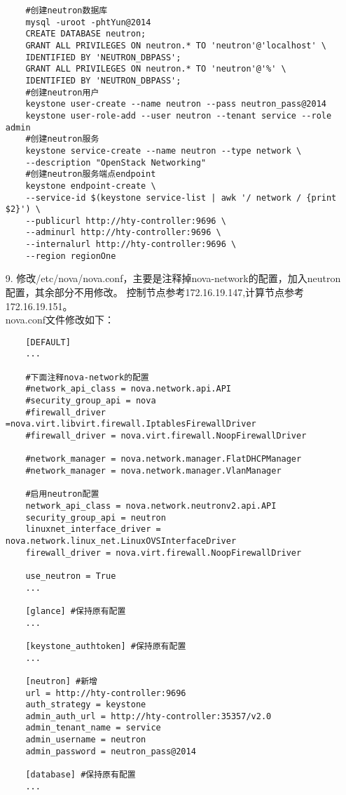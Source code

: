 \documentclass[a4paper,left=1.5cm,right=1.5cm,11pt]{article}
\begin{document}
\begin{itemize}
\begin{lstlisting}
	#创建neutron数据库
	mysql -uroot -phtYun@2014
	CREATE DATABASE neutron;
	GRANT ALL PRIVILEGES ON neutron.* TO 'neutron'@'localhost' \
	IDENTIFIED BY 'NEUTRON_DBPASS';
	GRANT ALL PRIVILEGES ON neutron.* TO 'neutron'@'%' \
	IDENTIFIED BY 'NEUTRON_DBPASS';
    #创建neutron用户
	keystone user-create --name neutron --pass neutron_pass@2014
	keystone user-role-add --user neutron --tenant service --role admin
	#创建neutron服务
	keystone service-create --name neutron --type network \
	--description "OpenStack Networking"
    #创建neutron服务端点endpoint
	keystone endpoint-create \
	--service-id $(keystone service-list | awk '/ network / {print $2}') \
	--publicurl http://hty-controller:9696 \
	--adminurl http://hty-controller:9696 \
	--internalurl http://hty-controller:9696 \
	--region regionOne
	\end{lstlisting}
    \item[9.]修改/etc/nova/nova.conf，主要是注释掉nova-network的配置，加入neutron配置，其余部分不用修改。
	控制节点参考172.16.19.147,计算节点参考172.16.19.151。\\
	nova.conf文件修改如下：
	\begin{lstlisting}
	[DEFAULT]
	...
	
	#下面注释nova-network的配置
	#network_api_class = nova.network.api.API
	#security_group_api = nova
	#firewall_driver =nova.virt.libvirt.firewall.IptablesFirewallDriver
	#firewall_driver = nova.virt.firewall.NoopFirewallDriver

	#network_manager = nova.network.manager.FlatDHCPManager
	#network_manager = nova.network.manager.VlanManager

	#启用neutron配置
	network_api_class = nova.network.neutronv2.api.API
	security_group_api = neutron
	linuxnet_interface_driver = nova.network.linux_net.LinuxOVSInterfaceDriver
	firewall_driver = nova.virt.firewall.NoopFirewallDriver

	use_neutron = True
	...

	[glance] #保持原有配置
	...

	[keystone_authtoken] #保持原有配置
	...
	
	[neutron] #新增
	url = http://hty-controller:9696
	auth_strategy = keystone
	admin_auth_url = http://hty-controller:35357/v2.0
	admin_tenant_name = service
	admin_username = neutron
	admin_password = neutron_pass@2014

	[database] #保持原有配置
	...


\end{lstlisting}
\end{itemize}
\end{document}
